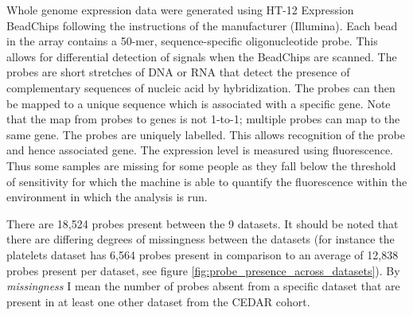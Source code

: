 \documentclass[14pt]{extarticle} %
\begin{document}
	Whole genome expression data were generated using HT-12 Expression BeadChips following the instructions of the manufacturer (Illumina). Each bead in the array contains a 50-mer, sequence-specific oligonucleotide probe. This allows for differential detection of signals when the BeadChips are scanned. The probes are short stretches of DNA or RNA that detect the presence of complementary sequences of nucleic acid by hybridization. The probes can then be mapped to a unique sequence which is associated with a specific gene. Note that the map from probes to genes is not 1-to-1; multiple probes can map to the same gene. The probes are uniquely labelled. This allows recognition of the probe and hence associated gene. The expression level is measured using fluorescence. Thus some samples are missing for some people as they fall below the threshold of sensitivity for which the machine is able to quantify the fluorescence within the environment in which the analysis is run.
	
	There are 18,524 probes present between the 9 datasets. It should be noted that there are differing degrees of missingness between the datasets (for instance the platelets dataset has 6,564 probes present in comparison to an average of 12,838 probes present per dataset, see figure \ref{fig:probe_presence_across_datasets}). By \emph{missingness} I mean the number of probes absent from a specific dataset that are present in at least one other dataset from the CEDAR cohort.
	
\end{document}
